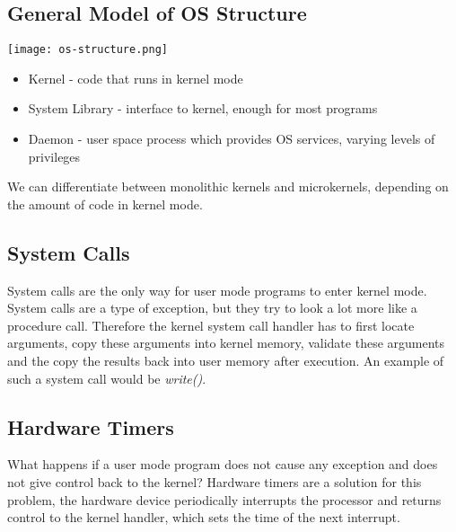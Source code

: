 \subsection{General Model of OS Structure}

\begin{center}
	\texttt{[image: os-structure.png]}
\end{center}

\begin{itemize}
	\item Kernel - code that runs in kernel mode
	\item System Library - interface to kernel, enough for most programs
	\item Daemon - user space process which provides OS services, varying levels of privileges
\end{itemize}

We can differentiate between monolithic kernels and microkernels, depending on the amount of code in kernel mode.


\subsection{System Calls}

System calls are the only way for user mode programs to enter kernel mode. System calls are a type of exception, but they try to look a lot more like a procedure call. Therefore the kernel system call handler has to first locate arguments, copy these arguments into kernel memory, validate these arguments and the copy the results back into user memory after execution. An example of such a system call would be \textit{write()}. 


\subsection{Hardware Timers}

What happens if a user mode program does not cause any exception and does not give control back to the kernel? Hardware timers are a solution for this problem, the hardware device periodically interrupts the processor and returns control to the kernel handler, which sets the time of the next interrupt.
